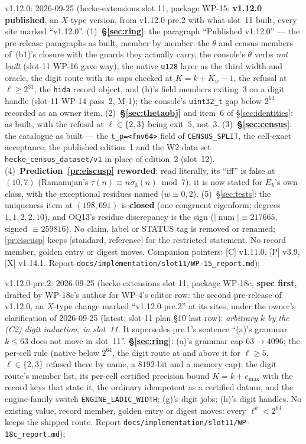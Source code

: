 \documentclass[11pt]{article}
\theoremstyle{remark}
\DeclareMathOperator{\num}{num}
\newcommand{\STD}{\textsf{[standard, reference]}}
\begin{document}
v1.12.0: 2026-09-25 (hecke-extensions slot 11, package WP-15: \textbf{v1.12.0
published}, an $X$-type version, from v1.12.0-pre.2 with what slot~11 built, every site marked
``v1.12.0''. (1)~\textbf{\S\ref{sec:ring}}: the paragraph ``Published v1.12.0'' --- the pre-release
paragraphs as built, member by member: the $\theta$ and census members of~(b1)'s closure with the
guards they actually carry, the console's $\theta$ verbs \emph{not built} (slot-11 WP-16 gave way),
the native \texttt{u128} layer as the third width and oracle, the digit route with its caps checked at
$K=k+K_w-1$, the refusal at $\ell\ge2^{31}$, the \texttt{hida} record object, and (h)'s field members
exiting~$3$ on a digit handle (slot-11 WP-14 pass~2, M-1); the console's \texttt{uint32\_t} gap
below $2^{64}$ recorded as an owner item. (2)~\textbf{\S\ref{sec:thetaobj}} and item~6 of
\S\ref{sec:identities}: as built, with the refusal at $\ell\in\{2,3\}$ being exit~$5$, not~$3$.
(3)~\textbf{\S\ref{sec:census}}: the catalogue as built --- the \texttt{t\_p=<fnv64>} field of
\texttt{CENSUS\_SPLIT}, the cell-exact acceptance, the published edition~1 and the W2 data set
\texttt{hecke\_census\_dataset/v1} in place of edition~2 (slot~12). (4)~\textbf{Prediction~\ref{pr:eiscusp}
reworded}: read literally, its ``iff'' is false at $(10,7)$ (Ramanujan's $\tau(n)\equiv n\sigma_3(n)\bmod7$);
it is now stated for $E_k$'s own class, with the exceptional residues named ($w\equiv0,2$). (5)~\S\ref{sec:tests}:
the uniqueness item at $(198,691)$ is \textbf{closed} (one congruent eigenform; degrees $1,1,2,2,10$), and
OQ13's residue discrepancy is the sign ($|\num|\equiv217665$, signed $\equiv259816$). No claim, label or
STATUS tag is removed or renamed; \ref{pr:eiscusp} keeps \STD{} for the restricted statement. No record
member, golden entry or digest moves. Companion pointers: [C] v1.11.0, [P] v3.9, [X] v1.14.1. Report
\texttt{docs/implementation/slot11/WP-15\_report.md});

v1.12.0-pre.2: 2026-09-25 (hecke-extensions slot 11, package WP-18c, \textbf{spec
first}, drafted by WP-18c's author for WP-4's editor row: the second pre-release of v1.12.0, an
$X$-type change marked ``v1.12.0-pre.2'' at its sites, under the owner's clarification of
2026-09-25 (latest; slot-11 plan \S10 last row): \emph{arbitrary $k$ by the (C2) digit induction,
in slot~11}. It supersedes pre.1's sentence ``(a)'s grammar $k\le63$ does not move in slot~11''.
\textbf{\S\ref{sec:ring}}: (a)'s grammar cap $63\to4096$; the per-cell rule (native below $2^{64}$,
the digit route at and above it for $\ell\ge5$, $\ell\in\{2,3\}$ refused there by name, a
$8192$-bit and a memory cap); the digit route's member list, its per-cell certified precision
bound $K=k+e_{\max}$ with the record keys that state it, the ordinary idempotent as a certified
datum, and the engine-family switch \texttt{ENGINE\_LADIC\_WIDTH}; (g)'s digit jobs; (h)'s digit
handles. No existing value, record member, golden entry or digest moves: every $\ell^k<2^{64}$
keeps the shipped route. Report \texttt{docs/implementation/slot11/WP-18c\_report.md});
\end{document}
